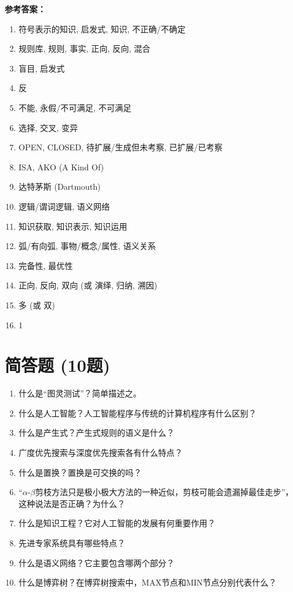 \textbf{参考答案：}
\begin{enumerate}[label=\arabic*.]
\item 符号表示的知识, 启发式, 知识, 不正确/不确定
\item 规则库, 规则, 事实, 正向, 反向, 混合
\item 盲目, 启发式
\item 反
\item 不能, 永假/不可满足, 不可满足
\item 选择, 交叉, 变异
\item OPEN, CLOSED, 待扩展/生成但未考察, 已扩展/已考察
\item ISA, AKO (A Kind Of)
\item 达特茅斯 (Dartmouth)
\item 逻辑/谓词逻辑, 语义网络
\item 知识获取, 知识表示, 知识运用
\item 弧/有向弧, 事物/概念/属性, 语义关系
\item 完备性, 最优性
\item 正向, 反向, 双向 (或 演绎, 归纳, 溯因)
\item 多 (或 双)
\item 1
\end{enumerate}

\section{简答题 (10题)}

\begin{enumerate}[leftmargin=2em,itemsep=1pt]
\item 什么是“图灵测试”？简单描述之。
\item 什么是人工智能？人工智能程序与传统的计算机程序有什么区别？
\item 什么是产生式？产生式规则的语义是什么？
\item 广度优先搜索与深度优先搜索各有什么特点？
\item 什么是置换？置换是可交换的吗？
\item “$\alpha$-$\beta$剪枝方法只是极小极大方法的一种近似，剪枝可能会遗漏掉最佳走步”，这种说法是否正确？为什么？
\item 什么是知识工程？它对人工智能的发展有何重要作用？
\item 先进专家系统具有哪些特点？
\item 什么是语义网络？它主要包含哪两个部分？
\item 什么是博弈树？在博弈树搜索中，MAX节点和MIN节点分别代表什么？
\end{enumerate}

